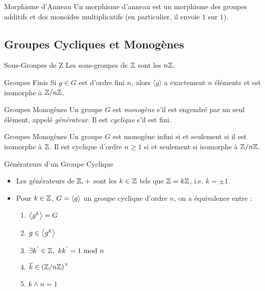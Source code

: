 \documentclass{cours}
\begin{document}
\begin{définition}{Morphisme d'Anneau}{}
    Un morphisme d'anneau est un morphisme des groupes additifs et des monoïdes multiplicatifs (en particulier, il envoie $1$ sur $1$).
\end{définition}

\subsection{Groupes Cycliques et Monogènes}
\begin{propositionfr}{Sous-Groupes de Z}{}
    Les sous-groupes de $\mathbb{Z}$ sont les $n\mathbb{Z}$.
\end{propositionfr}

\begin{propositionfr}{Groupes Finis}{}
    Si $g \in G$ est d'ordre fini $n$, alors $\langle g \rangle$ a exactement $n$ éléments et est isomorphe à $\mathbb{Z}/n\mathbb{Z}$.
\end{propositionfr}

\begin{définition}{Groupes Monogènes}{}
    Un groupe $G$ est \emph{monogène} s'il est engendré par un seul élément, appelé \emph{générateur}. Il est \emph{cyclique} s'il est fini.
\end{définition}

\begin{corollaire}{Groupes Monogènes}{}
    Un groupe $G$ est monogène infini si et seulement si il est isomorphe à $\mathbb{Z}$. Il est cyclique d'ordre $n \geq 1$ si et seulement si isomorphe à $\mathbb{Z}/n\mathbb{Z}$.
\end{corollaire}

\begin{propositionfr}{Générateurs d'un Groupe Cyclique}{}
    \begin{itemize}
        \item Les générateurs de $\mathbb{Z}, +$ sont les $k \in \mathbb{Z}$ tels que $\mathbb{Z} = k\mathbb{Z}$, i.e. $k = \pm 1$.
        \item Pour $k \in \mathbb{Z}$, $G = \left\langle g \right\rangle$ un groupe cyclique d'ordre $n$, on a équivalence entre :
              \begin{enumerate}
                  \item $\left\langle g^{k} \right\rangle = G$
                  \item $g \in \left\langle g^{k} \right\rangle$
                  \item $\exists k^{'} \in \mathbb{Z},\ kk^{'} = 1 \text{ mod } n$
                  \item $\overline{k} \in \left(\mathbb{Z}/n\mathbb{Z}\right)^{\times}$
                  \item $k \wedge n = 1$
              \end{enumerate}
    \end{itemize}
\end{propositionfr}
\end{document}
